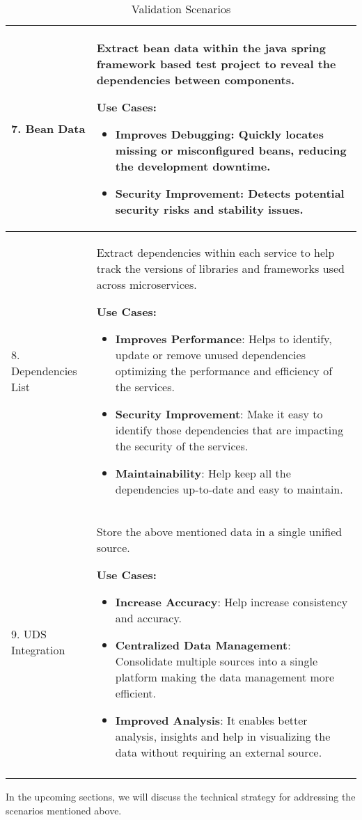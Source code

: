 \begin{longtable}{|m{4cm}|m{10cm}|}
7. Bean Data & Extract bean data within the java spring framework based test project to reveal the dependencies between components.

\textbf{Use Cases:}
\begin{itemize}
	\item \textbf{Improves Debugging}: Quickly locates missing or misconfigured beans, reducing the development downtime.
	\item \textbf{Security Improvement}: Detects potential security risks and stability issues.
\end{itemize}
\\ \hline

8. Dependencies List & Extract dependencies within each service to help track the versions of libraries and frameworks used across microservices.

\textbf{Use Cases:}
\begin{itemize}
	\item \textbf{Improves Performance}: Helps to identify, update or remove unused dependencies optimizing the performance and efficiency of the services.
	\item \textbf{Security Improvement}: Make it easy to identify those dependencies that are impacting the security of the services.
	\item \textbf{Maintainability}: Help keep all the dependencies up-to-date and easy to maintain.
\end{itemize}
\\ \hline

9. UDS Integration & Store the above mentioned data in a single unified source.

\textbf{Use Cases:}
\begin{itemize}
	\item \textbf{Increase Accuracy}:  Help increase consistency and accuracy.
	\item \textbf{Centralized Data Management}: Consolidate multiple sources into a single platform making the data management more efficient.
	\item \textbf{Improved Analysis}: It enables better analysis, insights and help in visualizing the data without requiring an external source.
\end{itemize}
\\ \hline

\caption{Validation Scenarios}	
\label{table_vision_scenarios}
\end{longtable}

In the upcoming sections, we will discuss the technical strategy for addressing the scenarios mentioned above.